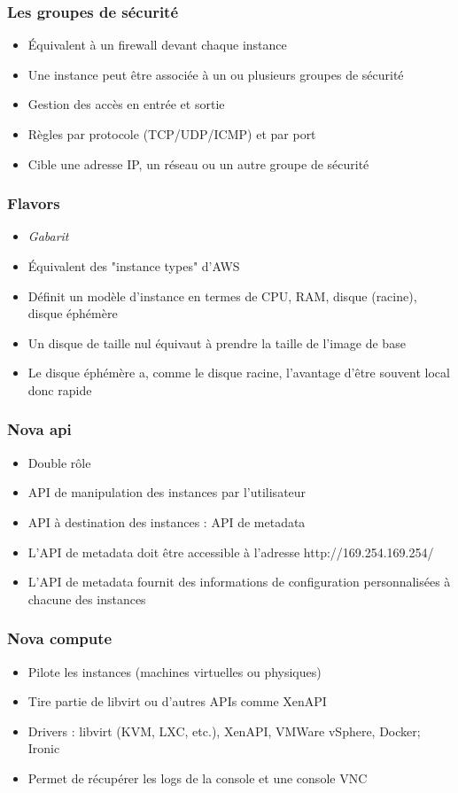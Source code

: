   \begin{frame}
    \frametitle{Les groupes de sécurité}
    \begin{itemize}
      \item Équivalent à un firewall devant chaque instance
      \item Une instance peut être associée à un ou plusieurs groupes de sécurité
      \item Gestion des accès en entrée et sortie
      \item Règles par protocole (TCP/UDP/ICMP) et par port
      \item Cible une adresse IP, un réseau ou un autre groupe de sécurité
    \end{itemize}
  \end{frame}

  \begin{frame}
    \frametitle{Flavors}
    \begin{itemize}
      \item \textit{Gabarit}
      \item Équivalent des "instance types" d'AWS
      \item Définit un modèle d'instance en termes de CPU, RAM, disque (racine), disque éphémère
      \item Un disque de taille nul équivaut à prendre la taille de l'image de base
      \item Le disque éphémère a, comme le disque racine, l'avantage d'être souvent local donc rapide
    \end{itemize}
  \end{frame}

  \begin{frame}
    \frametitle{Nova api}
    \begin{itemize}
      \item Double rôle
      \item API de manipulation des instances par l'utilisateur
      \item API à destination des instances : API de metadata
      \item L'API de metadata doit être accessible à l'adresse http://169.254.169.254/
      \item L'API de metadata fournit des informations de configuration personnalisées à chacune des instances
    \end{itemize}
  \end{frame}

  \begin{frame}
    \frametitle{Nova compute}
    \begin{itemize}
      \item Pilote les instances (machines virtuelles ou physiques)
      \item Tire partie de libvirt ou d'autres APIs comme XenAPI
      \item Drivers : libvirt (KVM, LXC, etc.), XenAPI, VMWare vSphere, Docker; Ironic
      \item Permet de récupérer les logs de la console et une console VNC
    \end{itemize}
  \end{frame}

